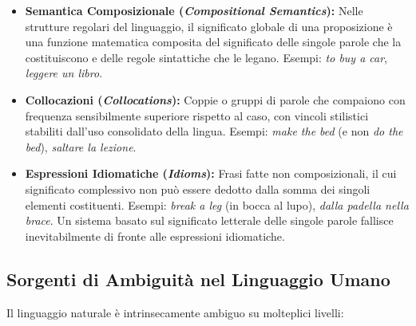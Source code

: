 \begin{itemize}
    \item \textbf{Semantica Composizionale (\textit{Compositional Semantics}):} Nelle strutture regolari del linguaggio, il significato globale di una proposizione \`e una funzione matematica composita del significato delle singole parole che la costituiscono e delle regole sintattiche che le legano. Esempi: \textit{to buy a car}, \textit{leggere un libro}.
    \item \textbf{Collocazioni (\textit{Collocations}):} Coppie o gruppi di parole che compaiono con frequenza sensibilmente superiore rispetto al caso, con vincoli stilistici stabiliti dall'uso consolidato della lingua. Esempi: \textit{make the bed} (e non \textit{do the bed}), \textit{saltare la lezione}.
    \item \textbf{Espressioni Idiomatiche (\textit{Idioms}):} Frasi fatte non composizionali, il cui significato complessivo non pu\`o essere dedotto dalla somma dei singoli elementi costituenti. Esempi: \textit{break a leg} (in bocca al lupo), \textit{dalla padella nella brace}. Un sistema basato sul significato letterale delle singole parole fallisce inevitabilmente di fronte alle espressioni idiomatiche.
\end{itemize}

\FloatBarrier
\subsection{Sorgenti di Ambiguit\`a nel Linguaggio Umano}
\label{subsec:sorgenti-ambiguita}

Il linguaggio naturale \`e intrinsecamente ambiguo su molteplici livelli:

